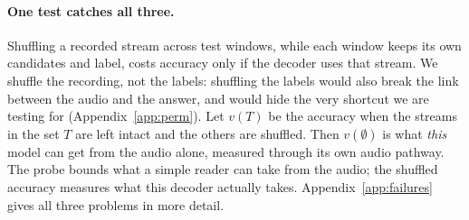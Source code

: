 \paragraph{One test catches all three.}
\label{sec:perm}
Shuffling a recorded stream across test windows, while each window keeps its own
candidates and label, costs accuracy only if the decoder uses that stream. We
shuffle the recording, not the labels: shuffling the labels would also break the
link between the audio and the answer, and would hide the very shortcut we are
testing for (Appendix~\ref{app:perm}). Let
$v(T)$ be the accuracy when the streams in the set $T$ are left intact and the
others are shuffled. Then $v(\emptyset)$ is what \emph{this} model can get from the
audio alone, measured through its own audio pathway. The probe bounds what a
simple reader can take from the audio; the shuffled accuracy measures what this
decoder actually takes. Appendix~\ref{app:failures} gives all three problems in
more detail.
